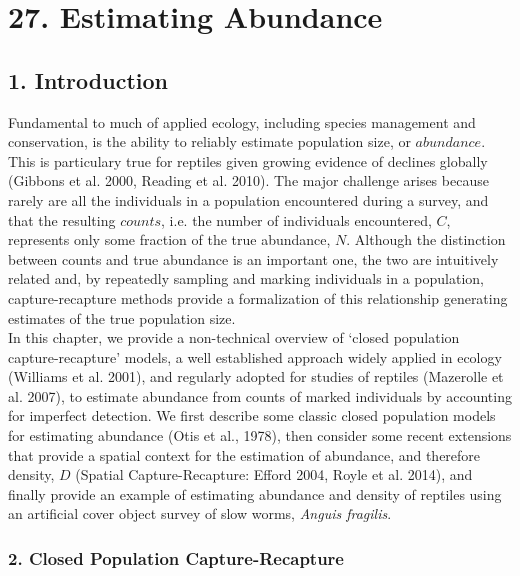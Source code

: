 \documentclass{book}
\begin{document}
\chapter*{27. Estimating Abundance\\
          }

\section*{1. Introduction}
Fundamental to much of applied ecology, including species management and conservation, is the ability to reliably estimate population size, or $abundance$. This is particulary true for reptiles given growing evidence of declines globally (Gibbons et al. 2000, Reading et al. 2010). The major challenge arises because rarely are all the individuals in a population encountered during a survey, and that the resulting $counts$, i.e. the number of individuals encountered, $C$, represents only some fraction of the true abundance, $N$. Although the distinction between counts and true abundance is an important one, the two are intuitively related and, by repeatedly sampling and marking individuals in a population, capture-recapture methods provide a formalization of this relationship generating estimates of the true population size.\\

In this chapter, we provide a non-technical overview of `closed population capture-recapture' models, a well established approach widely applied in ecology (Williams et al. 2001), and regularly adopted for studies of reptiles (Mazerolle et al. 2007), to estimate abundance from counts of marked individuals by accounting for imperfect detection. We first describe some classic closed population models for estimating abundance (Otis et al., 1978), then consider some recent extensions that provide a spatial context for the estimation of abundance, and therefore density, $D$ (Spatial Capture-Recapture: Efford 2004, Royle et al. 2014), and finally provide an example of estimating abundance and density of reptiles using an artificial cover object survey of slow worms, \textit{Anguis fragilis}.

\subsection*{2. Closed Population Capture-Recapture}
\end{document}

